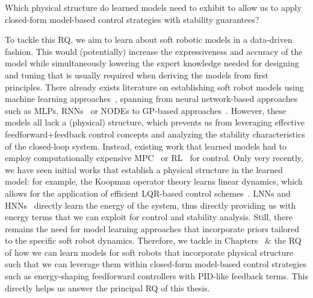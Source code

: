 \begin{researchquestion}\label{rq:physical_structure_learned_models}
    Which physical structure do learned models need to exhibit to allow us to apply closed-form model-based control strategies with stability guarantees? 
\end{researchquestion}
To tackle this \gls{RQ}, we aim to learn about soft robotic models in a data-driven fashion. This would (potentially) increase the expressiveness and accuracy of the model while simultaneously lowering the expert knowledge needed for designing and tuning that is usually required when deriving the models from first principles.
There already exists literature on establishing soft robot models using machine learning approaches~\cite{armanini2023soft, kim2021review, chen2024data}, spanning from neural network-based approaches~\cite{thuruthel2017learning} such as \glspl{MLP}, \glspl{RNN}~\cite{schafke2024learning} or \glspl{NODE} to \gls{GP}-based approaches~\cite{sabelhaus2021gaussian}.
However, these models all lack a (physical) structure, which prevents us from leveraging effective feedforward+feedback control concepts and analyzing the stability characteristics of the closed-loop system. Instead, existing work that learned models had to employ computationally expensive \gls{MPC}~\cite{gillespie2018learning, alora2023robust, schafke2024learning} or \gls{RL}~\cite{thuruthel2018model} for control.
Only very recently, we have seen initial works that establish a physical structure in the learned model: for example, the Koopman operator theory learns linear dynamics, which allows for the application of efficient \gls{LQR}-based control schemes~\cite{bruder2020data}. \glspl{LNN} and \glspl{HNN}~\cite{lutter2019deep} directly learn the energy of the system, thus directly providing us with energy terms that we can exploit for control and stability analysis.
Still, there remains the need for model learning approaches that incorporate priors tailored to the specific soft robot dynamics.
Therefore, we tackle in Chapters~\circled{\ref{chp:pcsregression}} \& \circled{\ref{chp:con}} the \gls{RQ} of how we can learn models for soft robots that incorporate physical structure such that we can leverage them within closed-form model-based control strategies such as energy-shaping feedforward controllers with PID-like feedback terms.
This directly helps us answer the principal \gls{RQ} of this thesis.


